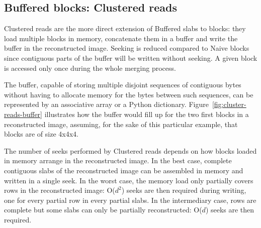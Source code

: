 \documentclass[10pt, conference, compsocconf]{IEEEtran}
\begin{document}
\subsection{Buffered blocks: Clustered reads}

Clustered reads are the more direct extension of Buffered slabs to
blocks: they load multiple blocks in memory, concatenate them in a
buffer and write the buffer in the reconstructed image. Seeking is
reduced compared to Naive blocks since contiguous parts of the
buffer will be written without seeking. A given
block is accessed only once during the whole merging process.

The buffer, capable of storing multiple
disjoint sequences of contiguous bytes without having to allocate
memory for the bytes between such
sequences, can be represented by an
associative array or a Python dictionary.
Figure~\ref{fig:cluster-reads-buffer} illustrates how the
buffer would fill up for the two first blocks in a reconstructed
image, assuming, for the sake of this particular example, that blocks are of size 4x4x4.

The number of seeks performed by Clustered reads depends on how blocks
loaded in memory arrange in the reconstructed image. In the best case,
complete contiguous slabs of the reconstructed image can be assembled
in memory and written in a single seek. In the worst case, the
memory load only partially covers rows in the reconstructed image:
O($d^2$) seeks are then required during writing, one for every partial
row in every partial slabs. In the intermediary case, rows are
complete but some slabs can only be partially reconstructed: O($d$)
seeks are then required.
\end{document}
